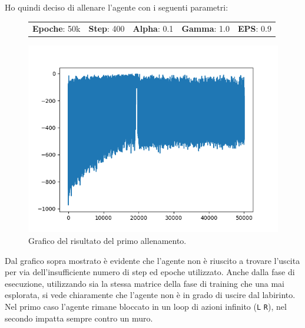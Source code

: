 Ho quindi deciso di allenare l'agente con i seguenti parametri:

\begin{figure}[H]
	\centering
	\begin{tabular}{c | c | c | c | c}
		\textbf{Epoche}: 50k & \textbf{Step}: 400 & \textbf{Alpha}: 0.1 & \textbf{Gamma}: 1.0 & \textbf{EPS}: 0.9
	\end{tabular}
\end{figure}
\begin{figure}[H]
	\centering
	\includegraphics[width=.6\textwidth]{img/primo_allenamento.png}
	\caption{Grafico del risultato del primo allenamento.}
\end{figure}

Dal grafico sopra mostrato \`{e} evidente che l'agente non \`{e} riuscito a trovare l'uscita per via dell'insufficiente numero di step ed epoche utilizzato. Anche dalla fase di esecuzione,  utilizzando sia la stessa matrice della fase di training che una mai esplorata, si vede chiaramente che l'agente non \`{e} in grado di uscire dal labirinto. Nel primo caso l'agente rimane bloccato in un loop di azioni infinito (\lstinline[style=cmd]|L| \lstinline[style=cmd]|R|), nel secondo impatta sempre contro un muro.

